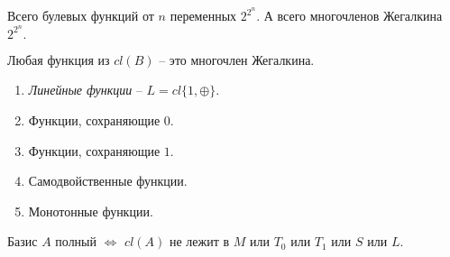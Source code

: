 Всего булевых функций от $n$ переменных $2^{2^n}.$ А всего многочленов Жегалкина $2^{2^n}.$ 

\begin{proposition}
    Любая функция из $cl(B)$ -- это многочлен Жегалкина.
\end{proposition}

\begin{definition}
    \begin{enumerate}
        \item \textit{Линейные функции} -- $L = cl\{1, \oplus\}.$
        
        \item Функции, сохраняющие $0.$

        \item Функции, сохраняющие $1.$

        \item Самодвойственные функции.

        \item Монотонные функции.
    \end{enumerate}
\end{definition}


\begin{theorem}
    Базис $A$ полный $\Longleftrightarrow$ $cl(A)$ не лежит в $M$ или $T_0$ или  $T_1$ или $S$ или $L.$
\end{theorem}